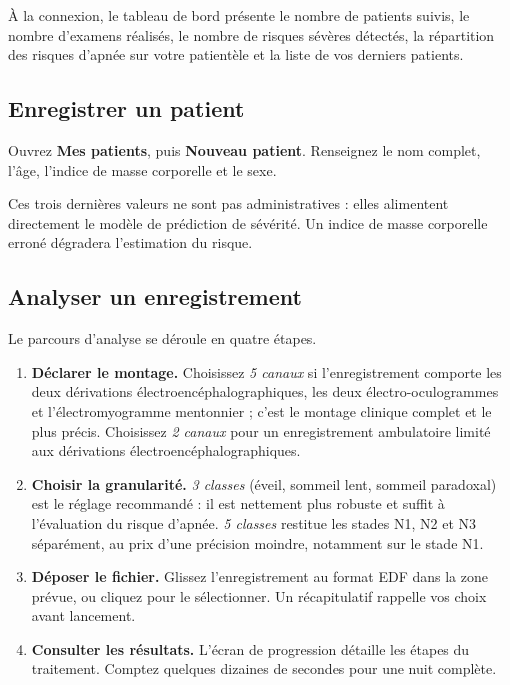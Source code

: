 À la connexion, le tableau de bord présente le nombre de patients suivis, le nombre
d'examens réalisés, le nombre de risques sévères détectés, la répartition des risques
d'apnée sur votre patientèle et la liste de vos derniers patients.

\subsection*{Enregistrer un patient}

Ouvrez \textbf{Mes patients}, puis \textbf{Nouveau patient}. Renseignez le nom complet,
l'âge, l'indice de masse corporelle et le sexe.

Ces trois dernières valeurs ne sont pas administratives : elles alimentent directement
le modèle de prédiction de sévérité. Un indice de masse corporelle erroné dégradera
l'estimation du risque.

\subsection*{Analyser un enregistrement}

Le parcours d'analyse se déroule en quatre étapes.

\begin{enumerate}[itemsep=3pt,topsep=4pt]
  \item \textbf{Déclarer le montage.} Choisissez \emph{5 canaux} si l'enregistrement
        comporte les deux dérivations électroencéphalographiques, les deux
        électro-oculogrammes et l'électromyogramme mentonnier ; c'est le montage
        clinique complet et le plus précis. Choisissez \emph{2 canaux} pour un
        enregistrement ambulatoire limité aux dérivations
        électroencéphalographiques.
  \item \textbf{Choisir la granularité.} \emph{3 classes} (éveil, sommeil lent,
        sommeil paradoxal) est le réglage recommandé : il est nettement plus robuste
        et suffit à l'évaluation du risque d'apnée. \emph{5 classes} restitue les
        stades N1, N2 et N3 séparément, au prix d'une précision moindre, notamment sur
        le stade N1.
  \item \textbf{Déposer le fichier.} Glissez l'enregistrement au format EDF dans la
        zone prévue, ou cliquez pour le sélectionner. Un récapitulatif rappelle vos
        choix avant lancement.
  \item \textbf{Consulter les résultats.} L'écran de progression détaille les étapes du
        traitement. Comptez quelques dizaines de secondes pour une nuit complète.
\end{enumerate}

